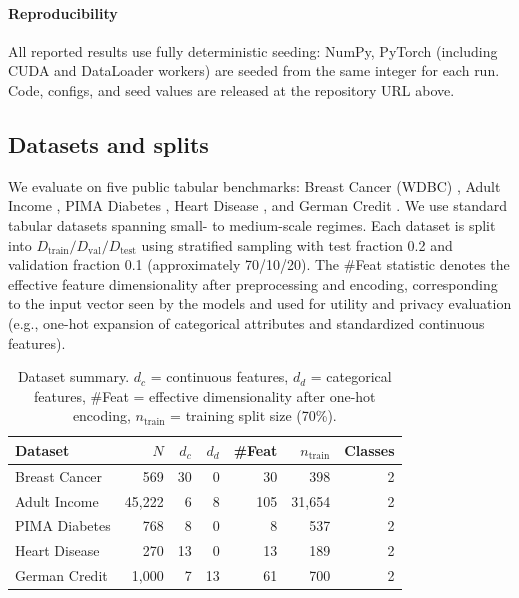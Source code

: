 \documentclass[preprint,12pt]{elsarticle}
\begin{document}
\paragraph{Reproducibility} All reported results use fully 
deterministic seeding: NumPy, PyTorch (including CUDA and DataLoader 
workers) are seeded from the same integer for each run. Code, 
configs, and seed values are released at the repository URL above.

\subsection{Datasets and splits}
We evaluate on five public tabular benchmarks: Breast Cancer (WDBC) \cite{BreastCancerWDBC}, Adult Income \cite{AdultIncome}, PIMA Diabetes \cite{PimaDiabetes}, Heart Disease \cite{HeartDisease}, and German Credit \cite{GermanCredit}.
We use standard tabular datasets spanning small- to medium-scale regimes. Each dataset is split into $D_{\text{train}}/D_{\text{val}}/D_{\text{test}}$ 
using stratified sampling with test fraction 0.2 and validation 
fraction 0.1 (approximately 70/10/20). The \#Feat statistic denotes the effective feature dimensionality after preprocessing and encoding, corresponding to the input vector seen by the models and used for utility and privacy evaluation (e.g., one-hot expansion of categorical attributes and standardized continuous features).
\begin{table}[t]
\centering
\caption{Dataset summary. $d_c$ = continuous features, $d_d$ = categorical features, \#Feat = effective dimensionality after one-hot encoding, $n_{\text{train}}$ = training split size (70\%).}
\label{tab:datasets}
\scriptsize
\setlength{\tabcolsep}{5pt}
\renewcommand{\arraystretch}{1.1}
\begin{tabular}{l r r r r r r}
\toprule
\rowcolor{tablehead}
\textbf{Dataset} & \textbf{$N$} & \textbf{$d_c$} & \textbf{$d_d$} & \textbf{\#Feat} & \textbf{$n_{\text{train}}$} & \textbf{Classes} \\
\midrule
Breast Cancer  & 569    & 30 & 0  & 30  & 398      & 2 \\
Adult Income   & 45{,}222 & 6  & 8  & 105 & 31{,}654 & 2 \\
PIMA Diabetes  & 768    & 8  & 0  & 8   & 537      & 2 \\
Heart Disease  & 270    & 13 & 0  & 13  & 189      & 2 \\
German Credit  & 1{,}000 & 7  & 13 & 61  & 700      & 2 \\
\bottomrule
\end{tabular}
\end{table}
\end{document}
